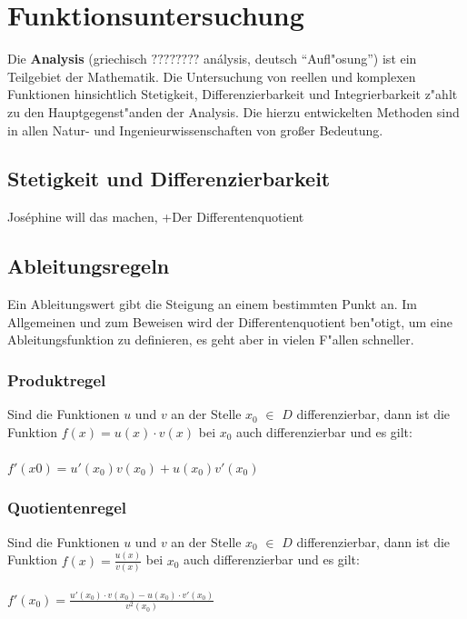 \chapter{Funktionsuntersuchung}

Die \textbf{Analysis} (griechisch $????????$ análysis, deutsch "`Aufl"osung"') ist ein Teilgebiet der Mathematik.  Die Untersuchung von reellen und komplexen Funktionen hinsichtlich Stetigkeit, Differenzierbarkeit und Integrierbarkeit z"ahlt zu den Hauptgegenst"anden der Analysis. Die hierzu entwickelten Methoden sind in allen Natur- und Ingenieurwissenschaften von großer Bedeutung.\\

\section{Stetigkeit und Differenzierbarkeit}

Joséphine will das machen, +Der Differentenquotient\\

\section{Ableitungsregeln}

Ein Ableitungswert gibt die Steigung an einem bestimmten Punkt an. Im Allgemeinen und zum Beweisen wird der Differentenquotient ben"otigt, um eine Ableitungsfunktion zu definieren, es geht aber in vielen F"allen schneller.

\subsection{Produktregel}

Sind die Funktionen $u$ und $v$ an der Stelle $x_{0}$ $\in$ $D$ differenzierbar, dann ist die Funktion $f(x)=u(x)\cdot v(x)$ bei $x_{0}$ auch differenzierbar und es gilt: \\
\\
$f'(x0) = u'(x_{0})v(x_{0})+u(x_{0})v'(x_{0})$\\


\subsection{Quotientenregel}

Sind die Funktionen $u$ und $v$ an der Stelle $x_{0}$ $\in$ $D$ differenzierbar, dann ist die Funktion $f(x)=\frac{u(x)} {v(x)}$ bei $x_{0}$ auch differenzierbar und es gilt: \\
\\
$f'(x_{0})=\frac{u'(x_{0})\cdot v(x_{0})-u(x_{0})\cdot v'(x_{0})}{v^2(x_{0})}$


